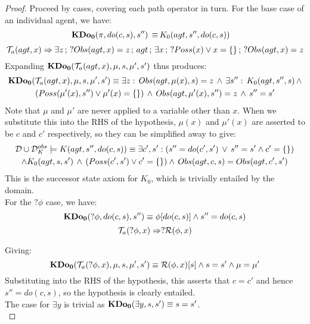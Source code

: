 \begin{proof}
Proceed by cases, covering each path operator in turn. For the base
case of an individual agent, we have:\begin{align*}
\mathbf{KDo_{0}}(\pi,do(c,s),s'')\,\equiv\, & K_{0}(agt,s'',do(c,s))\end{align*}
 \[
\mathcal{T}_{a}(agt,x)\Rightarrow\exists z\,;\,?Obs(agt,x)=z\,;\, agt\,;\,\exists x\,;\,?Poss(x)\vee x=\{\}\,;\,?Obs(agt,x)=z\]
 Expanding $\mathbf{KDo_{0}}(\mathcal{T}_{a}(agt,x),\mu,s,\mu',s')$ thus produces:\begin{multline*}
\mathbf{KDo_{0}}(\mathcal{T}_{a}(agt,x),\mu,s,\mu',s')\equiv\exists z:\, Obs(agt,\mu(x),s)=z\,\wedge\,\exists s'':\, K_{0}(agt,s'',s)\,\wedge\\
\left(Poss(\mu'(x),s'')\vee\mu'(x)=\{\}\right)\,\wedge\, Obs(agt,\mu'(x),s'')=z\,\wedge\, s''=s'\end{multline*}
 Note that $\mu$ and $\mu'$ are never applied to a variable other
than $x$. When we substitute this into the RHS of the hypothesis,
$\mu(x)$ and $\mu'(x)$ are asserted to be $c$ and $c'$ respectively,
so they can be simplified away to give:\begin{multline*}
\mathcal{D}\cup\mathcal{D}_{K}^{obs}\models K(agt,s'',do(c,s))\equiv\exists c',s':\left(s''=do(c',s')\,\vee\, s''=s'\wedge c'=\{\}\right)\\
\wedge K_{0}(agt,s,s')\,\wedge\,\left(Poss(c',s')\vee c'=\{\}\right)\wedge\, Obs(agt,c,s)=Obs(agt,c',s')\end{multline*}
 This is the successor state axiom for $K_{0}$, which is trivially
entailed by the domain.\\


For the $?\phi$ case, we have:\[
\mathbf{KDo_{0}}(?\phi,do(c,s),s'')\equiv\phi[do(c,s)]\wedge s''=do(c,s)\]
 \[
\mathcal{T}_{a}(?\phi,x)\Rightarrow?\mathcal{R}(\phi,x)\]


Giving:\[
\mathbf{KDo_{0}}(\mathcal{T}_{a}(?\phi,x),\mu,s,\mu',s')\equiv\mathcal{R}(\phi,x)[s]\wedge s=s'\wedge\mu=\mu'\]
 Substituting into the RHS of the hypothesis, this asserts that $c=c'$
and hence $s''=do(c,s)$, so the hypothesis is clearly entailed.\\


The case for $\exists y$ is trivial as $\mathbf{KDo_{0}}(\exists y,s,s')\equiv s=s'$.\\



\end{proof}
